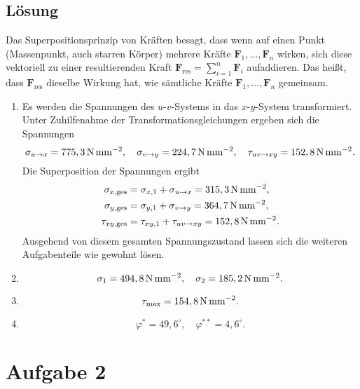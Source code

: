 \documentclass{exercise}
\begin{document}
    \subsection*{Lösung}
    Das Superpositionsprinzip von Kräften besagt, dass wenn auf einen Punkt (Massenpunkt, auch starren Körper) mehrere Kräfte \(\bm{F}_1, \ldots, \bm{F}_n\) wirken, sich diese vektoriell zu einer resultierenden Kraft \(\bm{F}_{\text{res}} = \sum_{i = 1}^n\bm{F}_i\) aufaddieren.
    Das heißt, dass \(\bm{F}_{\text{res}}\) dieselbe Wirkung hat, wie sämtliche Kräfte \(\bm{F}_1, \ldots, \bm{F}_n\) gemeinsam.
    \begin{enumerate}
        \item Es werden die Spannungen des \(u\)-\(v\)-Systems in das \(x\)-\(y\)-System transformiert.
        Unter Zuhilfenahme der Transformationsgleichungen ergeben sich die Spannungen
        \[
            \sigma_{u \to x} = 775,3\,\si{\newton\per\milli\meter\squared}, \quad \sigma_{v \to y} = 224,7\,\si{\newton\per\milli\meter\squared}, \quad \tau_{uv \to xy} = 152,8\,\si{\newton\per\milli\meter\squared}.
        \]
        Die Superposition der Spannungen ergibt
        \begin{align*}
            \sigma_{x, \text{ges}} &= \sigma_{x, 1} + \sigma_{u \to x} = 315,3\,\si{\newton\per\milli\meter\squared},\\
            \sigma_{y, \text{ges}} &= \sigma_{y, 1} + \sigma_{v \to y} = 364,7\,\si{\newton\per\milli\meter\squared},\\
            \tau_{xy, \text{ges}} &= \tau_{xy, 1} + \tau_{uv \to xy} = 152,8\,\si{\newton\per\milli\meter\squared}.
        \end{align*}
        Ausgehend von diesem gesamten Spannungszustand lassen sich die weiteren Aufgabenteile wie gewohnt lösen.
        \item
        \[
            \sigma_1 = 494,8\,\si{\newton\per\milli\meter\squared}, \quad \sigma_2 = 185,2\,\si{\newton\per\milli\meter\squared}.
        \]
        \item
        \[
            \tau_{\text{max}} = 154,8\,\si{\newton\per\milli\meter\squared}.
        \]
        \item
        \[
            \varphi^* = 49,6^\circ, \quad \varphi^{**} = 4,6^\circ.
        \]
    \end{enumerate}


    \section*{Aufgabe 2}
\end{document}

